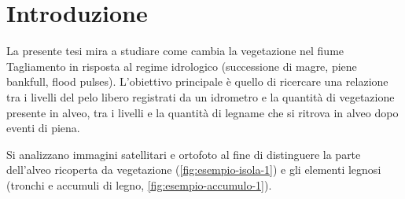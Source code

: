 \section{Introduzione}
La presente tesi mira a studiare come cambia la vegetazione nel fiume Tagliamento in risposta al regime idrologico (successione di magre, piene bankfull, flood pulses). 
L'obiettivo principale è quello di ricercare una relazione tra i livelli del pelo libero registrati da un idrometro e la quantità di vegetazione presente in alveo, tra i livelli e la quantità di legname che si ritrova in alveo dopo eventi di piena.

Si analizzano immagini satellitari e ortofoto al fine di distinguere la parte dell'alveo ricoperta da vegetazione (\vref{fig:esempio-isola-1}) e gli elementi legnosi (tronchi e accumuli di legno, \vref{fig:esempio-accumulo-1}).

